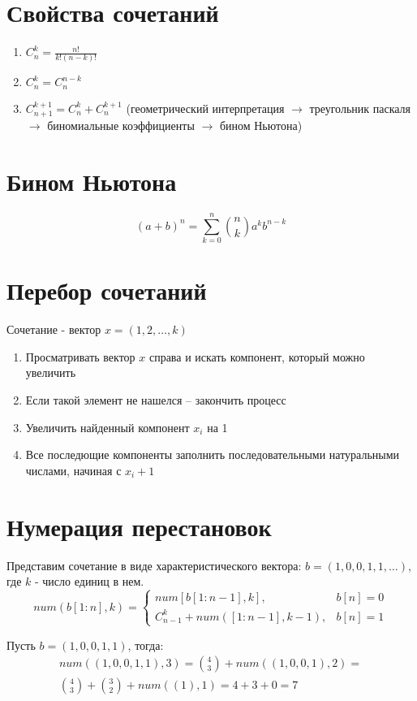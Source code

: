 \documentclass[main]{subfiles}
\begin{document}
\section{Свойства сочетаний}
\begin{enumerate}
    \item $C_n^k = \frac{n!}{k!(n-k)!}$
    \item $C_n^k = C_n^{n-k}$
    \item $C_{n+1}^{k+1} = C_n^k + C_n^{k+1}$ (геометрический интерпретация
$\rightarrow$ треугольник паскаля $\rightarrow$ биномиальные коэффициенты 
$\rightarrow$ бином Ньютона) 
\end{enumerate}


\section{Бином Ньютона}
\[
    (a + b)^{n}=\sum _{k=0}^{n}{\binom {n}{k} a^k b^{n-k}}
\]

\section{Перебор сочетаний}
Сочетание - вектор $x = (1, 2, \ldots, k)$
\begin{enumerate}
    \item Просматривать вектор $x$ справа и искать компонент, который можно
увеличить
    \item Если такой элемент не нашелся -- закончить процесс
    \item Увеличить найденный компонент $x_i$ на 1
    \item Все последющие компоненты заполнить последовательными натуральными
числами, начиная с $x_i + 1$
\end{enumerate}

\section{Нумерация перестановок}
Представим сочетание в виде характеристического вектора: 
$b=(1,0,0,1,1, \ldots)$,
где $k$ - число единиц в нем.
\begin{equation*}
    num(b[1:n], k) = \begin{cases}
        num[b[1:n-1], k], & b[n] = 0 \\
        C_{n-1}^k + num([1:n-1], k - 1), & b[n] = 1
    \end{cases}
\end{equation*}
\begin{case}
    Пусть $b=(1,0,0,1,1)$, тогда:
    \begin{multline*}
        num((1,0,0,1,1), 3) = \binom{4}{3} + num((1,0,0,1), 2) = \\ 
        \binom{4}{3} + \binom{3}{2} + num((1), 1) = 4 + 3 + 0 = 7     
    \end{multline*}
\end{case}
\end{document}
